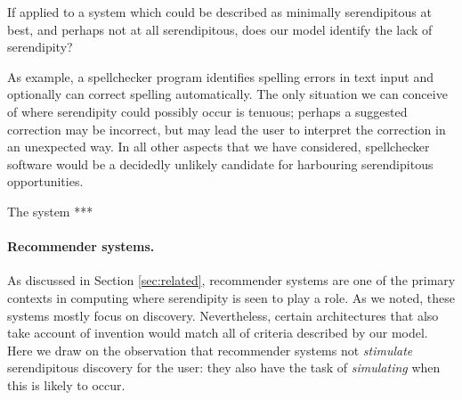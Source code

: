 If applied to a system which could be described as minimally serendipitous at best, and perhaps not at all serendipitous, does our model identify the lack of serendipity?

As example, a spellchecker program identifies spelling errors in text input and optionally can correct spelling automatically. The only situation we can conceive of where serendipity could possibly occur is tenuous; perhaps a suggested correction may be incorrect, but may lead the user to interpret the correction in an unexpected way. In all other aspects that we have considered, spellchecker software would be a decidedly unlikely candidate for harbouring serendipitous opportunities.

The system *** %


\paragraph{Recommender systems.} 

As discussed in Section \ref{sec:related}, recommender systems are one
of the primary contexts in computing where serendipity is seen to play
a role.  As we noted, these systems mostly focus on discovery.
Nevertheless, certain architectures that also take account of
invention would match all of criteria described by our model.  Here we
draw on the observation that recommender systems not \emph{stimulate}
serendipitous discovery for the user: they also have the task of
\emph{simulating} when this is likely to occur.

